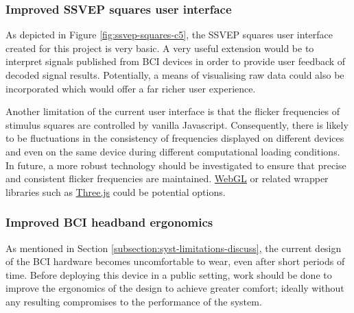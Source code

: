 \subsubsection{Improved SSVEP squares user interface}
As depicted in Figure \ref{fig:ssvep-squares-c5}, the SSVEP squares user interface created for this project is very basic. A very useful extension would be to interpret signals published from BCI devices in order to provide user feedback of decoded signal results. Potentially, a means of visualising raw data could also be incorporated which would offer a far richer user experience. 

Another limitation of the current user interface is that the flicker frequencies of stimulus squares are controlled by vanilla Javascript. Consequently, there is likely to be fluctuations in the consistency of frequencies displayed on different devices and even on the same device during different computational loading conditions. In future, a more robust technology should be investigated to ensure that precise and consistent flicker frequencies are maintained. \href{https://www.khronos.org/webgl/}{WebGL} or related wrapper libraries such as \href{https://threejs.org/}{Three.js} could be potential options.

\subsubsection{Improved BCI headband ergonomics}
As mentioned in Section \ref{subsection:syst-limitations-discuss}, the current design of the BCI hardware becomes uncomfortable to wear, even after short periods of time. Before deploying this device in a public setting, work should be done to improve the ergonomics of the design to achieve greater comfort; ideally without any resulting compromises to the performance of the system.